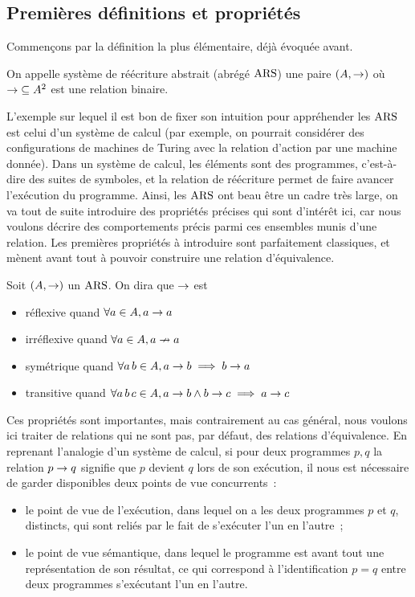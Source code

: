 \subsection{Premières définitions et propriétés}

\noindent
Commençons par la définition la plus élémentaire, déjà évoquée avant.

\begin{definition}
  On appelle système de réécriture abstrait (abrégé $\operatorname{ARS}$) une paire
  $(A,\mathrel{\to})$ où $\mathord{\mathrel{\to}}\subseteq A^2$ est une relation
  binaire.
\end{definition}

L'exemple sur lequel il est bon de fixer son intuition pour appréhender les
$\operatorname{ARS}$ est celui d'un système de calcul (par exemple, on pourrait considérer
des configurations de machines de Turing avec la relation d'action par une
machine donnée). Dans un système de calcul, les éléments sont des programmes,
c'est-à-dire des suites de symboles, et la relation de réécriture permet de
faire avancer l'exécution du programme. Ainsi, les $\operatorname{ARS}$ ont beau être un cadre
très large, on va tout de suite introduire des propriétés précises qui sont
d'intérêt ici, car nous voulons décrire des comportements précis parmi ces
ensembles munis d'une relation. Les premières propriétés à introduire sont
parfaitement classiques, et mènent avant tout à pouvoir construire une relation
d'équivalence.

\begin{definition}
  Soit $(A,\mathrel{\to})$ un $\operatorname{ARS}$. On dira que $\mathrel{\to}$ est
  \begin{itemize}
  \item réflexive quand $\forall a \in A, a \mathrel{\to} a$
  \item irréflexive quand $\forall a \in A, a\mathrel{\nrightarrow} a$
  \item symétrique quand
    $\forall a\,b\in A, a\mathrel{\to} b \implies b \mathrel{\to} a$
  \item transitive quand
    $\forall a\,b\,c\in A, a \mathrel{\to} b \land b \mathrel{\to} c \implies
    a \mathrel{\to} c$
  \end{itemize}
\end{definition}

Ces propriétés sont importantes, mais contrairement au cas général, nous
voulons ici traiter de relations qui ne sont pas, par défaut, des relations
d'équivalence. En reprenant l'analogie d'un système de calcul, si pour deux
programmes $p,q$ la relation $p\mathrel{\to} q$ signifie que $p$ devient $q$ lors de
son exécution, il nous est nécessaire de garder disponibles deux points de
vue concurrents~:
\begin{itemize}
\item le point de vue de l'exécution, dans lequel on a les deux programmes
  $p$ et $q$, distincts, qui sont reliés par le fait de s'exécuter l'un en
  l'autre~;
\item le point de vue sémantique, dans lequel le programme est avant tout une
  représentation de son résultat, ce qui correspond à l'identification
  $p = q$ entre deux programmes s'exécutant l'un en l'autre.
\end{itemize}

